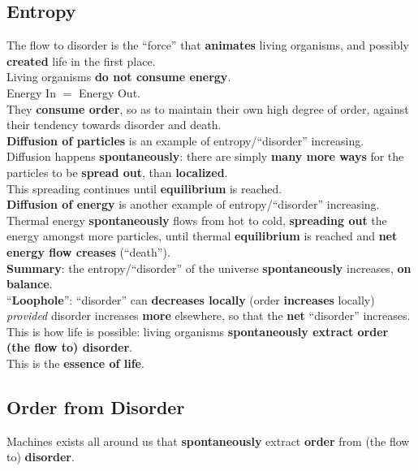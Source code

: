 \documentclass[12pt]{article}
\theoremstyle{definition}
\begin{document}
\subsection{Entropy}
The flow to disorder is the ``force'' that \textbf{animates} living organisms, and possibly \textbf{created} life in the first place. \\

Living organisms \textbf{do not consume energy}. \\
Energy In $=$ Energy Out. \\

They \textbf{consume order}, so as to maintain their own high degree of order, against their tendency towards disorder and death. \\

\textbf{Diffusion of particles} is an example of entropy/``disorder'' increasing. \\
Diffusion happens \textbf{spontaneously}: there are simply \textbf{many more ways} for the particles to be \textbf{spread out}, than \textbf{localized}. \\
This spreading continues until \textbf{equilibrium} is reached. \\

\textbf{Diffusion of energy} is another example of entropy/``disorder'' increasing. \\
Thermal energy \textbf{spontaneously} flows from hot to cold, \textbf{spreading out} the energy amongst more particles, until thermal \textbf{equilibrium} is reached and \textbf{net energy flow creases} (``death''). \\

\textbf{Summary}: the entropy/``disorder'' of the universe \textbf{spontaneously} increases, \textbf{on balance}. \\
``\textbf{Loophole}'': ``disorder'' can \textbf{decreases locally} (order \textbf{increases} locally) \emph{provided} disorder increases \textbf{more} elsewhere, so that the \textbf{net} ``disorder'' increases. \\
This is how life is possible: living organisms \textbf{spontaneously extract order (the flow to) disorder}. \\
This is the \textbf{essence of life}. \\


\subsection{Order from Disorder}
Machines exists all around us that \textbf{spontaneously} extract \textbf{order} from (the flow to) \textbf{disorder}. \\
\end{document}
